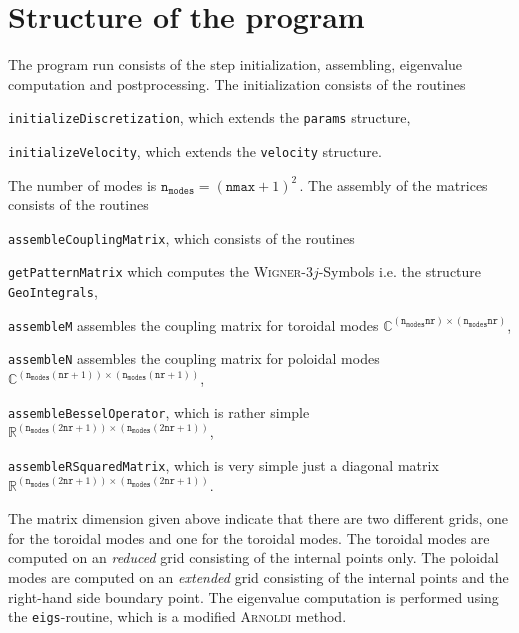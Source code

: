 \section{Structure of the program}
The program run consists of the step initialization, assembling, eigenvalue computation and postprocessing.
The initialization consists of the routines
\begin{compactitem}
	\item \texttt{initializeDiscretization}, which extends the \texttt{params} structure,
	\item \texttt{initializeVelocity}, which extends the \texttt{velocity} structure.
\end{compactitem}
The number of modes is $\texttt{n}_\texttt{modes}=\left(\texttt{nmax}+1\right)^2\,.$ The assembly of the 
matrices consists of the routines
\begin{compactitem}
	\item \texttt{assembleCouplingMatrix}, which consists of the routines
		\begin{compactitem}
			\item \texttt{getPatternMatrix} which computes the \textsc{Wigner}-$3j$-Symbols i.e. the 
			structure \texttt{GeoIntegrals},
			\item \texttt{assembleM} assembles the coupling matrix for toroidal modes 
			$\mathbb{C}^{\left(\texttt{n}_\texttt{modes}\texttt{nr}\right)\times
			\left(\texttt{n}_\texttt{modes}\texttt{nr}\right)}$,
			\item \texttt{assembleN} assembles the coupling matrix for poloidal modes
			$\mathbb{C}^{\left(\texttt{n}_\texttt{modes}\left(\texttt{nr}+1\right)\right)\times
						\left(\texttt{n}_\texttt{modes}\left(\texttt{nr}+1\right)\right)}$,
		\end{compactitem}
	\item \texttt{assembleBesselOperator}, which is rather simple 
	$\mathbb{R}^{\left(\texttt{n}_\texttt{modes}\left(2\texttt{nr}+1\right)\right)\times
							\left(\texttt{n}_\texttt{modes}\left(2\texttt{nr}+1\right)\right)}$,
	\item \texttt{assembleRSquaredMatrix}, which is very simple just a diagonal matrix 
	$\mathbb{R}^{\left(\texttt{n}_\texttt{modes}\left(2\texttt{nr}+1\right)\right)\times
							\left(\texttt{n}_\texttt{modes}\left(2\texttt{nr}+1\right)\right)}$.
\end{compactitem}
The matrix dimension given above indicate that there are two different grids, one for the toroidal modes and 
one for the toroidal modes. The toroidal modes are computed on an \emph{reduced} grid consisting of the 
internal points only. The poloidal modes are computed on an \emph{extended} grid consisting of the internal 
points and the right-hand side boundary point. The eigenvalue computation is performed using the 
\texttt{eigs}-routine, which is a modified \textsc{Arnoldi} method.
